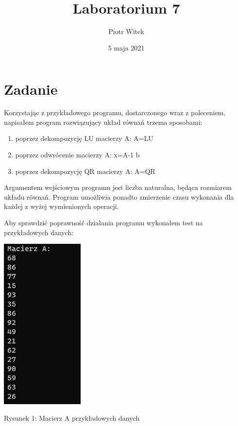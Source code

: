 \documentclass[5]{article}
\title{Laboratorium 7}
\author{Piotr Witek}
\date{5 maja 2021}
\begin{document}

\maketitle


\section{Zadanie}

\hspace{4mm} Korzystając z przykładowego programu, dostarczonego wraz z poleceniem, napisałem program rozwiązujący układ równań trzema sposobami: 
\begin{enumerate}
    \item poprzez  dekompozycję LU macierzy A: A=LU
    \item poprzez odwrócenie macierzy A: x=A-1 b
    \item poprzez dekompozycję QR macierzy A: A=QR
\end{enumerate}

Argumentem wejściowym programu jest liczba naturalna, będąca rozmiarem układu równań. Program umożliwia ponadto zmierzenie czasu wykonania dla każdej z wyżej wymienionych operacji.

\vspace{4mm}
Aby sprawdzić poprawność działania programu wykonałem test na przykładowych danych:

\begin{center}
    \includegraphics[scale=0.8]{przyklad_A.PNG} \par
    \vspace{3mm}
\end{center}
\hfil{Rysunek 1: Macierz A przykładowych danych} \par
\end{document}
